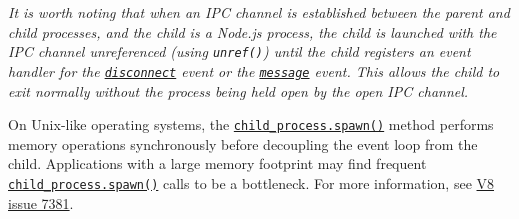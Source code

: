 \begin{Shaded}
\begin{Highlighting}[]
\OperatorTok{=} \NormalTok{(}\NormalTok{)}\OperatorTok{;}

\NormalTok{(}\OperatorTok{,}\NormalTok{ []}\OperatorTok{,}\NormalTok{ \{ }\OperatorTok{:} \NormalTok{ \})}\OperatorTok{;}

\NormalTok{(}\OperatorTok{,}\NormalTok{ []}\OperatorTok{,}\NormalTok{ \{ }\OperatorTok{:}\NormalTok{ [}\OperatorTok{,} \OperatorTok{,} \NormalTok{] \})}\OperatorTok{;}

\NormalTok{(}\OperatorTok{,}\NormalTok{ []}\OperatorTok{,}\NormalTok{ \{ }\OperatorTok{:}\NormalTok{ [}\OperatorTok{,} \OperatorTok{,} \OperatorTok{,} \OperatorTok{,} \NormalTok{] \})}\OperatorTok{;}
\end{Highlighting}
\end{Shaded}

\emph{It is worth noting that when an IPC channel is established between
the parent and child processes, and the child is a Node.js process, the
child is launched with the IPC channel unreferenced (using
\texttt{unref()}) until the child registers an event handler for the
\href{process.md\#event-disconnect}{\texttt{\textquotesingle{}disconnect\textquotesingle{}}}
event or the
\href{process.md\#event-message}{\texttt{\textquotesingle{}message\textquotesingle{}}}
event. This allows the child to exit normally without the process being
held open by the open IPC channel.}

On Unix-like operating systems, the
\hyperref[child_processspawncommand-args-options]{\texttt{child\_process.spawn()}}
method performs memory operations synchronously before decoupling the
event loop from the child. Applications with a large memory footprint
may find frequent
\hyperref[child_processspawncommand-args-options]{\texttt{child\_process.spawn()}}
calls to be a bottleneck. For more information, see
\href{https://bugs.chromium.org/p/v8/issues/detail?id=7381}{V8 issue
7381}.

